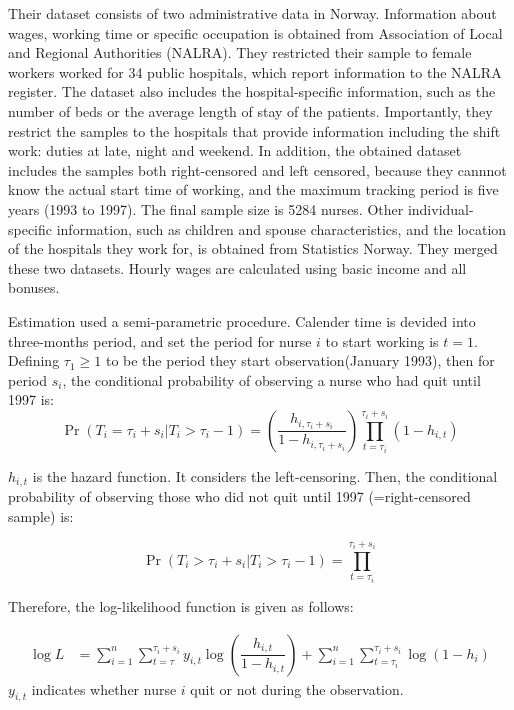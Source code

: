 \documentclass[dvipdfmx, 12pt]{article}
\begin{document}
Their dataset consists of two administrative data in Norway. Information about wages, working time or specific occupation is obtained from Association of Local and Regional Authorities (NALRA). They restricted their sample to female workers worked for 34 public hospitals, which report information to the NALRA register. The dataset also includes the hospital-specific information, such as the number of beds or the average length of stay of the patients. Importantly, they restrict the samples to the hospitals that provide information including the shift work: duties at late, night and weekend. In addition, the obtained dataset includes the samples both right-censored and left censored, because they cannnot know the actual start time of working, and the maximum tracking period is five years (1993 to 1997). The final sample size is 5284 nurses. Other individual-specific information, such as children and spouse characteristics, and the location of the hospitals they work for, is obtained from Statistics Norway. They merged these two datasets. Hourly wages are calculated using basic income and all bonuses.

\vspace{0.7zw}

Estimation used a semi-parametric procedure. Calender time is devided into three-months period, and set the period for nurse $i$ to start working is $t=1$. Defining $\tau_1 \geq 1$ to be the period they start observation(January 1993), then for period $s_i$, the conditional probability of observing a nurse who had quit until 1997 is:
\[
\Pr(T_i = \tau_i + s_i | T_i > \tau_i - 1)  = \left( \dfrac{h_{i, \tau_i + s_i}}{1 - h_{i, \tau_i + s_i}}\right) \prod_{t = \tau_i}^{\tau_i + s_i}(1 - h_{i, t})
\]

$h_{i, t}$ is the hazard function. It considers the left-censoring. Then, the conditional probability of observing those who did not quit until 1997 (=right-censored sample) is:

\[
\Pr(T_i > \tau_i + s_i | T_i > \tau_i - 1) = \prod_{t = \tau_i}^{\tau_i + s_i}
\]

Therefore, the log-likelihood function is given as follows:

\begin{align*}
  \log L &= \sum_{i = 1}^n \sum_{t = \tau}^{\tau_i + s_i} y_{i, t} \log \left( \dfrac{h_{i,t}}{1 - h_{i, t}} \right) + \sum_{i = 1}^n \sum_{t = \tau_i}^{\tau_i + s_i} \log (1 - h_i)
\end{align*}
$y_{i, t}$ indicates whether nurse $i$ quit or not during the observation.
\end{document}
